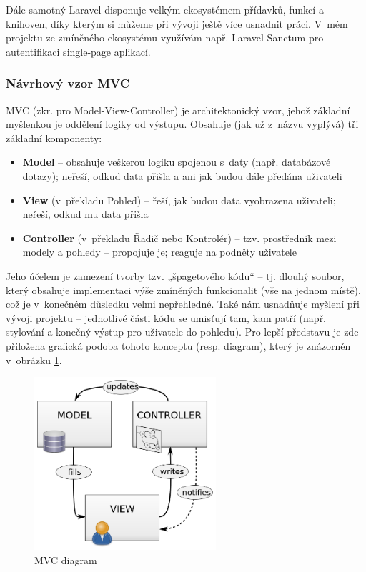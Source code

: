 	Dále samotný Laravel disponuje velkým ekosystémem přídavků, funkcí a knihoven, díky kterým si můžeme při vývoji ještě více usnadnit práci. \cite{LaravelEco} V~mém projektu ze zmíněného ekosystému využívám např. Laravel Sanctum pro autentifikaci single-page aplikací.
	
		\subsubsection{Návrhový vzor MVC}
		MVC (zkr. pro Model-View-Controller) je architektonický vzor, jehož základní myšlenkou je oddělení logiky od výstupu. Obsahuje (jak už z~názvu vyplývá) tři základní komponenty:
		
		\begin{itemize}
			\item \textbf{Model} – obsahuje veškerou logiku spojenou s~daty (např. databázové dotazy); neřeší, odkud data přišla a ani jak budou dále předána uživateli
			\item \textbf{View} (v~překladu Pohled) – řeší, jak budou data vyobrazena uživateli; neřeší, odkud mu data přišla
			\item \textbf{Controller} (v~překladu Řadič nebo Kontrolér) – tzv. prostředník mezi modely a pohledy – propojuje je; reaguje na podněty uživatele
		\end{itemize}
	
		Jeho účelem je zamezení tvorby tzv. „špagetového kódu“ – tj. dlouhý soubor, který obsahuje implementaci výše zmíněných funkcionalit (vše na jednom místě), což je v~konečném důsledku velmi nepřehledné. Také nám usnadňuje myšlení při vývoji projektu – jednotlivé části kódu se umisťují tam, kam patří (např. stylování a konečný výstup pro uživatele do pohledu). \cite{MVC} Pro lepší představu je zde přiložena grafická podoba tohoto konceptu (resp. diagram), který je znázorněn v~obrázku \ref{fig:mvc_diagram}.
		
		\begin{figure}[h]
			\centering
			\includegraphics[width=0.6\textwidth]{img/mvc_diagram.png}
			\caption{MVC diagram \cite{MVCDiagram}}
			\label{fig:mvc_diagram}
		\end{figure}
		
